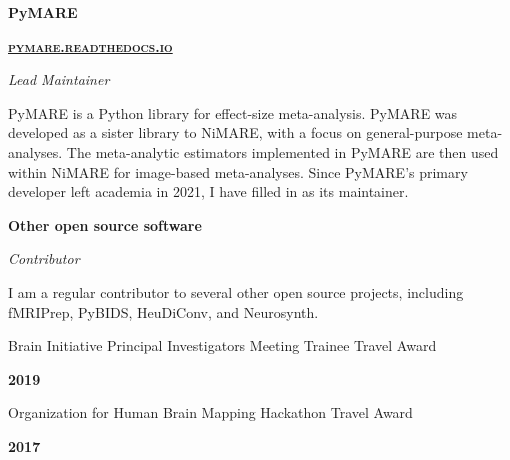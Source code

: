 \documentclass[10pt]{article}
\newcommand{\shorturl}[1]{\href{https://#1}{\textsc{#1}}}
\newcommand{\sectionstyle}{\LARGE \fontfamily{lmr}\selectfont}
\begin{document}
\bigskip

\begin{minipage}[t]{.5\linewidth}
	\flushleft
	\noindent
	\textbf{PyMARE}
\end{minipage}
\hfill
\begin{minipage}[t]{.5\linewidth}
	\flushright
	\noindent
	\textbf{\shorturl{pymare.readthedocs.io}}
\end{minipage}

\emph{Lead Maintainer}

\begin{adjustwidth}{2em}{0em}
	PyMARE is a Python library for effect-size meta-analysis.
	PyMARE was developed as a sister library to NiMARE, with a focus on general-purpose meta-analyses.
	The meta-analytic estimators implemented in PyMARE are then used within NiMARE for image-based meta-analyses.
	Since PyMARE's primary developer left academia in 2021, I have filled in as its maintainer.
\end{adjustwidth}

\bigskip

\begin{minipage}[t]{.5\linewidth}
	\flushleft
	\noindent
	\textbf{Other open source software}
\end{minipage}
\hfill

\emph{Contributor}

\begin{adjustwidth}{2em}{0em}
	I am a regular contributor to several other open source projects, including fMRIPrep, PyBIDS, HeuDiConv, and Neurosynth.
\end{adjustwidth}

\bigskip

\begin{center}\sectionstyle{HONORS AND AWARDS}\end{center}

\begin{minipage}[t]{.85\linewidth}
	\flushleft
	\noindent
	Brain Initiative Principal Investigators Meeting Trainee Travel Award
\end{minipage}
\hfill
\begin{minipage}[t]{.15\linewidth}
	\flushright
	\noindent
	\textsc{\textbf{2019}}
\end{minipage}

\begin{minipage}[t]{.85\linewidth}
	\flushleft
	\noindent
	Organization for Human Brain Mapping Hackathon Travel Award
\end{minipage}
\hfill
\begin{minipage}[t]{.15\linewidth}
	\flushright
	\noindent
	\textsc{\textbf{2017}}
\end{minipage}
\end{document}
